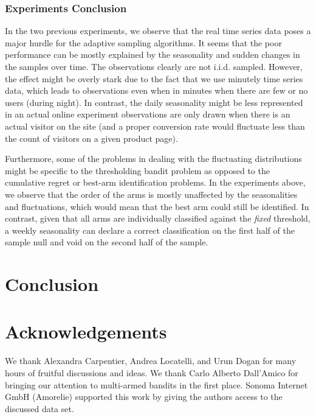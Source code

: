 \documentclass[11pt,]{article}
\begin{document}
\subsubsection{Experiments Conclusion}\label{experiments-conclusion}

In the two previous experiments, we observe that the real time series
data poses a major hurdle for the adaptive sampling algorithms. It seems
that the poor performance can be mostly explained by the seasonality and
sudden changes in the samples over time. The observations clearly are
not i.i.d. sampled. However, the effect might be overly stark due to the
fact that we use minutely time series data, which leads to observations
even when in minutes when there are few or no users (during night). In
contrast, the daily seasonality might be less represented in an actual
online experiment observations are only drawn when there is an actual
visitor on the site (and a proper conversion rate would fluctuate less
than the count of visitors on a given product page).

Furthermore, some of the problems in dealing with the fluctuating
distributions might be specific to the thresholding bandit problem as
opposed to the cumulative regret or best-arm identification problems. In
the experiments above, we observe that the order of the arms is mostly
unaffected by the seasonalities and fluctuations, which would mean that
the best arm could still be identified. In contrast, given that all arms
are individually classified against the \emph{fixed} threshold, a weekly
seasonality can declare a correct classification on the first half of
the sample null and void on the second half of the sample.

\section{Conclusion}\label{conclusion-1}

\section{Acknowledgements}\label{acknowledgements}

We thank Alexandra Carpentier, Andrea Locatelli, and Urun Dogan for many
hours of fruitful discussions and ideas. We thank Carlo Alberto
Dall'Amico for bringing our attention to multi-armed bandits in the
first place. Sonoma Internet GmbH (Amorelie) supported this work by
giving the authors access to the discussed data set.
\end{document}
